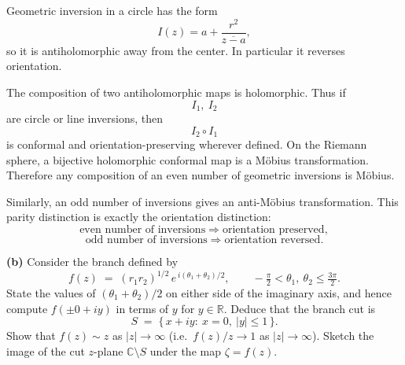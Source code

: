 

\begin{solution}
Geometric inversion in a circle has the form
\[
I(z)
=
a+\frac{r^2}{\overline{z-a}},
\]
so it is antiholomorphic away from the center. In particular it reverses orientation.

The composition of two antiholomorphic maps is holomorphic. Thus if
\[
I_1,\ I_2
\]
are circle or line inversions, then
\[
I_2\circ I_1
\]
is conformal and orientation-preserving wherever defined. On the Riemann sphere, a bijective holomorphic conformal map is a M\"obius transformation. Therefore any composition of an even number of geometric inversions is M\"obius.

Similarly, an odd number of inversions gives an anti-M\"obius transformation. This parity distinction is exactly the orientation distinction:
\[
\text{even number of inversions}\Rightarrow\text{orientation preserved},
\]
\[
\text{odd number of inversions}\Rightarrow\text{orientation reversed}.
\]
\end{solution}


\begin{problem}[CP-IV-0023]
\label{prob:cp-iv-0023}
\par\noindent\textbullet\quad \textbf{(b)}\;
	Consider the branch defined by
	\[
	f(z) \;=\; (r_{1}r_{2})^{1/2} \, e^{\,i(\theta_{1}+\theta_{2})/2},
	\qquad -\tfrac{\pi}{2}<\theta_{1},\ \theta_{2}\le \tfrac{3\pi}{2}.
	\]
	State the values of \((\theta_{1}+\theta_{2})/2\) on either side of the imaginary axis,
	and hence compute \(f(\pm0+iy)\) in terms of \(y\) for \(y\in\mathbb{R}\).
	Deduce that the branch cut is
	\[
	S \;=\; \{\,x+iy:\ x=0,\ |y|\le 1\,\}.
	\]
	Show that \(f(z)\sim z\) as \(|z|\to\infty\)
	(i.e.\ \(f(z)/z\to 1\) as \(|z|\to\infty\)).
	Sketch the image of the cut \(z\)-plane \(\mathbb{C}\setminus S\) under the map \(\zeta=f(z)\).

	\medskip
\end{problem}



